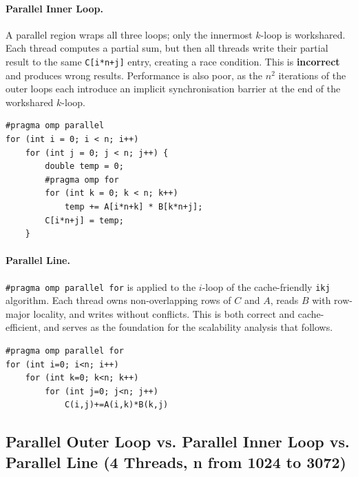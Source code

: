 \documentclass[12pt,a4paper]{article}
\begin{document}
\paragraph{Parallel Inner Loop.}
A parallel region wraps all three loops; only the innermost $k$-loop is
workshared. Each thread computes a partial sum, but then all threads write
their partial result to the same \texttt{C[i*n+j]} entry, creating a race
condition. This is \textbf{incorrect} and produces wrong results. Performance
is also poor, as the $n^2$ iterations of the outer loops each introduce an
implicit synchronisation barrier at the end of the workshared $k$-loop.

\begin{lstlisting}[style=cppstyle, caption={Parallel inner loop}]
#pragma omp parallel
for (int i = 0; i < n; i++)
    for (int j = 0; j < n; j++) {
        double temp = 0;
        #pragma omp for
        for (int k = 0; k < n; k++)
            temp += A[i*n+k] * B[k*n+j];
        C[i*n+j] = temp;
    }
\end{lstlisting}

\paragraph{Parallel Line.}
\texttt{\#pragma omp parallel for} is applied to the $i$-loop of the
cache-friendly \texttt{ikj} algorithm. Each thread owns non-overlapping rows
of $C$ and $A$, reads $B$ with row-major locality, and writes without
conflicts. This is both correct and cache-efficient, and serves as the
foundation for the scalability analysis that follows.

\begin{lstlisting}[style=cppstyle, caption={Parallel Line}]
#pragma omp parallel for
for (int i=0; i<n; i++)
    for (int k=0; k<n; k++)
        for (int j=0; j<n; j++)
            C(i,j)+=A(i,k)*B(k,j)
\end{lstlisting}

\subsection{Parallel Outer Loop vs. Parallel Inner Loop vs. Parallel Line
            (4 Threads, n from 1024 to 3072)}
\label{subsec:par_comparison}
\end{document}
